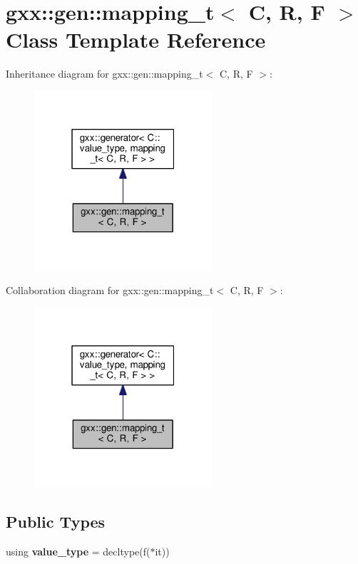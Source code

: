 \hypertarget{classgxx_1_1gen_1_1mapping__t}{}\section{gxx\+:\+:gen\+:\+:mapping\+\_\+t$<$ C, R, F $>$ Class Template Reference}
\label{classgxx_1_1gen_1_1mapping__t}


Inheritance diagram for gxx\+:\+:gen\+:\+:mapping\+\_\+t$<$ C, R, F $>$\+:\nopagebreak
\begin{figure}[H]
\begin{center}
\leavevmode
\includegraphics[width=187pt]{classgxx_1_1gen_1_1mapping__t__inherit__graph}
\end{center}
\end{figure}


Collaboration diagram for gxx\+:\+:gen\+:\+:mapping\+\_\+t$<$ C, R, F $>$\+:\nopagebreak
\begin{figure}[H]
\begin{center}
\leavevmode
\includegraphics[width=187pt]{classgxx_1_1gen_1_1mapping__t__coll__graph}
\end{center}
\end{figure}
\subsection*{Public Types}
\begin{DoxyCompactItemize}
\item 
using {\bfseries value\+\_\+type} = decltype(f($\ast$it))\hypertarget{classgxx_1_1gen_1_1mapping__t_a2533f5c95f0987d0af88448ca8b10137}{}\label{classgxx_1_1gen_1_1mapping__t_a2533f5c95f0987d0af88448ca8b10137}

\end{DoxyCompactItemize}
